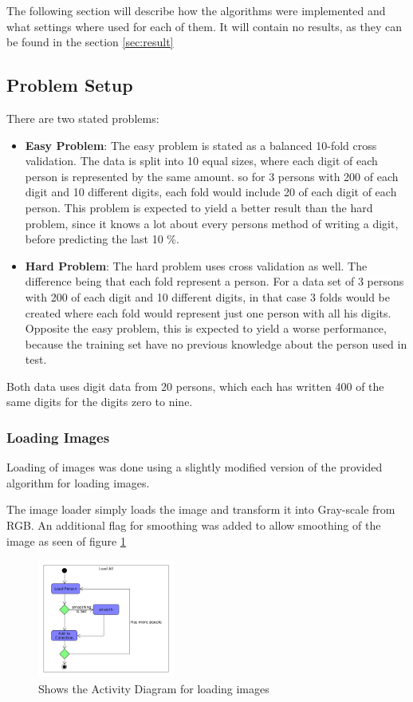 \documentclass[report]{subfiles}
\begin{document}
\label{sec:implementation}

The following section will describe how the algorithms were implemented and what settings where used for each of them. It will contain no results, as they can be found in the section \ref{sec:result} 

\subsection{Problem Setup}
\label{sec:impProblemSetup}
There are two stated problems:
\begin{itemize}
\item \textbf{Easy Problem}: The easy problem is stated as a balanced 10-fold cross validation. The data is split into 10 equal sizes, where each digit of each person is represented by the same amount. so for 3 persons with 200 of each digit and 10 different digits, each fold would include 20 of each digit of each person.
  This problem is expected to yield a better result than the hard problem, since it knows a lot about every persons method of writing a digit, before predicting the last 10 \%.  
\item \textbf{Hard Problem}: The hard problem uses cross validation as well. The difference being that each fold represent a person. For a data set of 3 persons with 200 of each digit and 10 different digits, in that case 3 folds would be created where each fold would represent just one person with all his digits.
  Opposite the easy problem, this is expected to yield a worse performance, because the training set have no previous knowledge about the person used in test. 
\end{itemize}

Both data uses digit data from 20 persons, which each has written 400 of the same digits for the digits zero to nine.

\subsubsection{Loading Images}
\label{sec:imploadingImages}
Loading of images was done using a slightly modified version of the provided algorithm for loading images.

The image loader simply loads the image and transform it into Gray-scale from RGB.
An additional flag for smoothing was added to allow smoothing of the image as seen of figure \ref{fig:loading}

\begin{figure}[H]
  \centering
  \includegraphics[width=0.4\textwidth]{UML/load}
  \caption{Shows the Activity Diagram for loading images}
  \label{fig:loading}
\end{figure}
\end{document}
